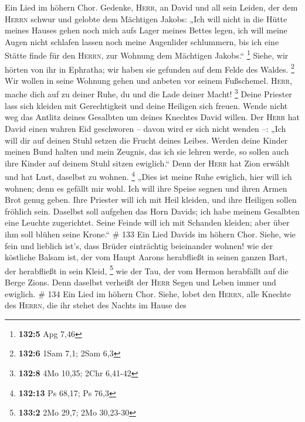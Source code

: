  Ein Lied im höhern Chor. Gedenke, \textsc{Herr}, an David
und all sein Leiden,  der dem \textsc{Herrn} schwur und
gelobte dem Mächtigen Jakobs:  „Ich will nicht in die
Hütte meines Hauses gehen noch mich aufs Lager meines Bettes legen,
 ich will meine Augen nicht schlafen lassen noch meine
Augenlider schlummern,  bis ich eine Stätte finde für den
\textsc{Herrn}, zur Wohnung dem Mächtigen Jakobs.`` \footnote{\textbf{132:5}
  Apg 7,46}  Siehe, wir hörten von ihr in Ephratha; wir
haben sie gefunden auf dem Felde des Waldes. \footnote{\textbf{132:6}
  1Sam 7,1; 2Sam 6,3}  Wir wollen in seine Wohnung gehen
und anbeten vor seinem Fußschemel.  \textsc{Herr}, mache
dich auf zu deiner Ruhe, du und die Lade deiner Macht! \footnote{\textbf{132:8}
  4Mo 10,35; 2Chr 6,41-42}  Deine Priester lass sich
kleiden mit Gerechtigkeit und deine Heiligen sich freuen.
 Wende nicht weg das Antlitz deines Gesalbten um deines
Knechtes David willen.  Der \textsc{Herr} hat David einen
wahren Eid geschworen -- davon wird er sich nicht wenden --: „Ich will
dir auf deinen Stuhl setzen die Frucht deines Leibes. 
Werden deine Kinder meinen Bund halten und mein Zeugnis, das ich sie
lehren werde, so sollen auch ihre Kinder auf deinem Stuhl sitzen
ewiglich.``  Denn der \textsc{Herr} hat Zion erwählt und
hat Lust, daselbst zu wohnen. \footnote{\textbf{132:13} Ps 68,17; Ps
  76,3}  „Dies ist meine Ruhe ewiglich, hier will ich
wohnen; denn es gefällt mir wohl.  Ich will ihre Speise
segnen und ihren Armen Brot genug geben.  Ihre Priester
will ich mit Heil kleiden, und ihre Heiligen sollen fröhlich sein.
 Daselbst soll aufgehen das Horn Davids; ich habe meinem
Gesalbten eine Leuchte zugerichtet.  Seine Feinde will
ich mit Schanden kleiden; aber über ihm soll blühen seine Krone.`` \#
133  Ein Lied Davids im höhern Chor. Siehe, wie fein und
lieblich ist's, dass Brüder einträchtig beieinander wohnen!
 wie der köstliche Balsam ist, der vom Haupt Aarons
herabfließt in seinen ganzen Bart, der herabfließt in sein Kleid,
\footnote{\textbf{133:2} 2Mo 29,7; 2Mo 30,23-30}  wie der
Tau, der vom Hermon herabfällt auf die Berge Zions. Denn daselbst
verheißt der \textsc{Herr} Segen und Leben immer und ewiglich. \# 134
 Ein Lied im höhern Chor. Siehe, lobet den \textsc{Herrn},
alle Knechte des \textsc{Herrn}, die ihr stehet des Nachts im Hause des
